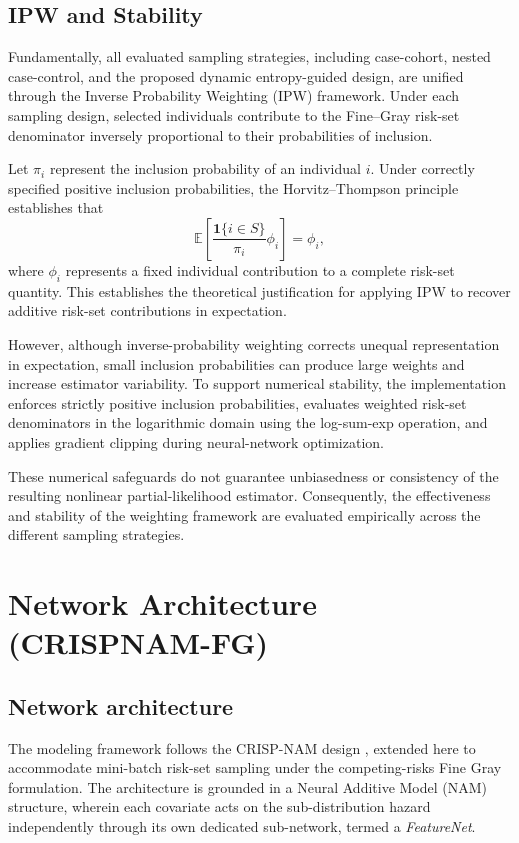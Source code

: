\documentclass[a4paper,twoside,12pt]{report}
\begin{document}
\subsection{IPW and Stability}

Fundamentally, all evaluated sampling strategies, including case-cohort, nested case-control, and the proposed dynamic entropy-guided design, are unified through the Inverse Probability Weighting (IPW) framework. Under each sampling design, selected individuals contribute to the Fine--Gray risk-set denominator inversely proportional to their probabilities of inclusion.

Let $\pi_i$ represent the inclusion probability of an individual $i$. Under correctly specified positive inclusion probabilities, the Horvitz--Thompson \cite{HorvitzThompson1952} principle establishes that
\begin{equation}
    \mathbb{E}\left[
        \frac{\mathbf{1}\{i \in S\}}{\pi_i}\phi_i
    \right]
    = \phi_i,
\end{equation}
where $\phi_i$ represents a fixed individual contribution to a complete risk-set quantity. This establishes the theoretical justification for applying IPW to recover additive risk-set contributions in expectation.

However, although inverse-probability weighting corrects unequal representation in expectation, small inclusion probabilities can produce large weights and increase estimator variability. To support numerical stability, the implementation enforces strictly positive inclusion probabilities, evaluates weighted risk-set denominators in the logarithmic domain using the log-sum-exp operation, and applies gradient clipping during neural-network optimization.

These numerical safeguards do not guarantee unbiasedness or consistency of the resulting nonlinear partial-likelihood estimator. Consequently, the effectiveness and stability of the weighting framework are evaluated empirically across the different sampling strategies.
\section{Network Architecture (CRISPNAM-FG)}
\subsection{Network architecture}

The modeling framework follows the CRISP-NAM design \citep{InterpretableFineGray2025}, extended here to accommodate mini-batch risk-set sampling under the competing-risks Fine Gray formulation. The architecture is grounded in a Neural Additive Model (NAM) structure, wherein each covariate acts on the sub-distribution hazard independently through its own dedicated sub-network, termed a \textit{FeatureNet}.
\end{document}
